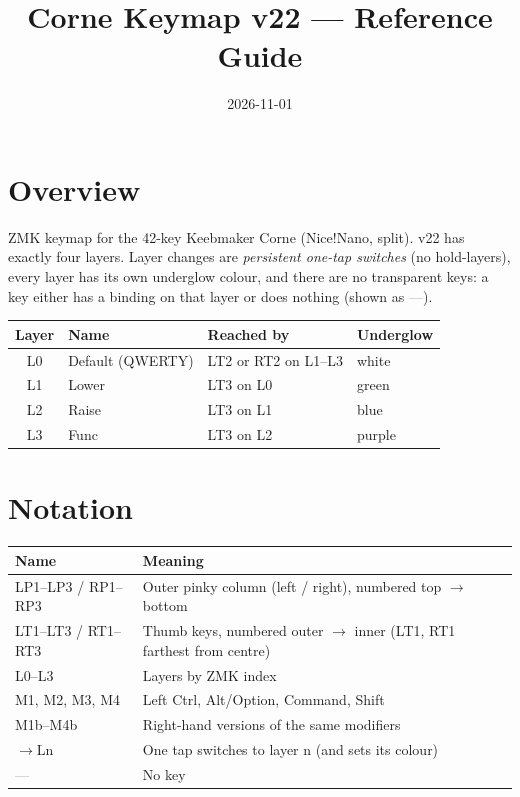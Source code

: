 \documentclass[11pt, letterpaper]{article}
\title{\textbf{Corne Keymap v22 --- Reference Guide}}
\author{}
\date{2026-11-01}
\newcommand{\nk}{\textcolor{gray}{---}}  %
\newcommand{\gl}[1]{$\to$L#1}            %
\begin{document}
\maketitle
\tableofcontents
\newpage

\section{Overview}

ZMK keymap for the 42-key Keebmaker Corne (Nice!Nano, split). v22 has
exactly four layers. Layer changes are \emph{persistent one-tap switches}
(no hold-layers), every layer has its own underglow colour, and there are
no transparent keys: a key either has a binding on that layer or does
nothing (shown as \nk).

\begin{center}
\begin{tabular}{clll}
\toprule
\textbf{Layer} & \textbf{Name} & \textbf{Reached by} & \textbf{Underglow} \\
\midrule
L0 & Default (QWERTY) & LT2 or RT2 on L1--L3 & white \\
L1 & Lower  & LT3 on L0 & green \\
L2 & Raise  & LT3 on L1 & blue \\
L3 & Func   & LT3 on L2 & purple \\
\bottomrule
\end{tabular}
\end{center}

\section{Notation}

\begin{tabular}{lp{11cm}}
\toprule
\textbf{Name} & \textbf{Meaning} \\
\midrule
LP1--LP3 / RP1--RP3 & Outer pinky column (left / right), numbered top $\to$ bottom \\
LT1--LT3 / RT1--RT3 & Thumb keys, numbered outer $\to$ inner (LT1, RT1 farthest from centre) \\
L0--L3 & Layers by ZMK index \\
M1, M2, M3, M4 & Left Ctrl, Alt/Option, Command, Shift \\
M1b--M4b & Right-hand versions of the same modifiers \\
\gl{n} & One tap switches to layer n (and sets its colour) \\
\nk & No key \\
\bottomrule
\end{tabular}
\end{document}
